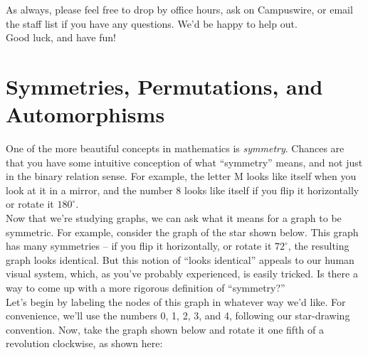 \documentclass{article}
\renewcommand{\(}{\left(}
\renewcommand{\)}{\right)}
\theoremstyle{plain}
\theoremstyle{plain}
\theoremstyle{definition}
\begin{document}
As always, please feel free to drop by office hours, ask on Campuswire, or email the staff list if you have
any questions. We'd be happy to help out. \\

Good luck, and have fun! 
\pagebreak





\section{Symmetries, Permutations, and Automorphisms}

One of the more beautiful concepts in mathematics is \textit{symmetry}. Chances are that you have some intuitive conception of what ``symmetry'' means, and not just in the binary relation sense. For example, the letter M looks like itself when you look at it in a mirror, and the number 8 looks like itself if you flip it horizontally or rotate it $180^\circ$. \\

Now that we're studying graphs, we can ask what it means for a graph to be symmetric. For example, consider the graph of the  star shown below. This graph has many symmetries -- if you flip it horizontally, or rotate it $72^\circ$, the resulting graph looks identical. But this notion of ``looks identical'' appeals to our human visual system, which, as you've probably experienced, is easily tricked. Is there a way to come up with a more rigorous definition of ``symmetry?'' \\

Let's begin by labeling the nodes of this graph in whatever way we'd like. For convenience, we'll use the numbers 0, 1, 2, 3, and 4, following our star-drawing convention. Now, take the graph shown below and rotate it one fifth of a revolution clockwise, as shown here:
\end{document}

